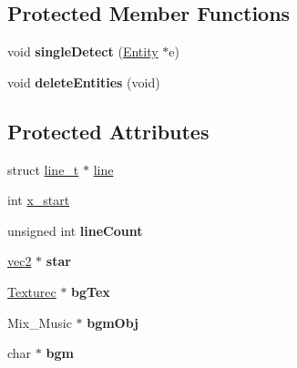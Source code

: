 \subsection*{Protected Member Functions}
\begin{DoxyCompactItemize}
\item 
\hypertarget{classWorld_a0af69654347b29787877b77020fa0a5a}{}void {\bfseries single\+Detect} (\hyperlink{classEntity}{Entity} $\ast$e)\label{classWorld_a0af69654347b29787877b77020fa0a5a}

\item 
\hypertarget{classWorld_a1c1e6ea7fd0d84660d2791a256aba382}{}void {\bfseries delete\+Entities} (void)\label{classWorld_a1c1e6ea7fd0d84660d2791a256aba382}

\end{DoxyCompactItemize}
\subsection*{Protected Attributes}
\begin{DoxyCompactItemize}
\item 
struct \hyperlink{structline__t}{line\+\_\+t} $\ast$ \hyperlink{classWorld_afd9945f6ede5eabc3ff9243ce2b31247}{line}
\item 
int \hyperlink{classWorld_a645767ccf316a9b4469db773ac111ae4}{x\+\_\+start}
\item 
\hypertarget{classWorld_a432e07fd7f7504aaa6ff29408afe0678}{}unsigned int {\bfseries line\+Count}\label{classWorld_a432e07fd7f7504aaa6ff29408afe0678}

\item 
\hypertarget{classWorld_a4f8b12f8eda220060ec01c0e9a6b9325}{}\hyperlink{structvec2}{vec2} $\ast$ {\bfseries star}\label{classWorld_a4f8b12f8eda220060ec01c0e9a6b9325}

\item 
\hypertarget{classWorld_accebca6a747c3db27916770507aee04c}{}\hyperlink{classTexturec}{Texturec} $\ast$ {\bfseries bg\+Tex}\label{classWorld_accebca6a747c3db27916770507aee04c}

\item 
\hypertarget{classWorld_a7ca21c1e62a53cf7024801623aa46325}{}Mix\+\_\+\+Music $\ast$ {\bfseries bgm\+Obj}\label{classWorld_a7ca21c1e62a53cf7024801623aa46325}

\item 
\hypertarget{classWorld_ad8269981b3846aa44b721cdeda30911c}{}char $\ast$ {\bfseries bgm}\label{classWorld_ad8269981b3846aa44b721cdeda30911c}

\end{DoxyCompactItemize}


